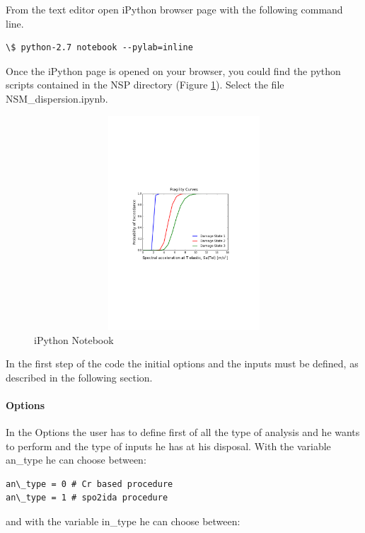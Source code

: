From the text editor open iPython browser page with the following command line. 

\begin{Verbatim}[frame=single, commandchars=\\\{\}, samepage=true]
\$ python-2.7 notebook --pylab=inline
\end{Verbatim}

Once the iPython page is opened on your browser, you could find the python scripts contained in the NSP directory (Figure \ref{fig:notebook}). Select the file NSM\_dispersion.ipynb.

\begin{figure}[H]
\centering
\includegraphics[width=12cm,height=8cm]{./figures/IdealisedCurve.pdf}
\caption{iPython Notebook}
\label{fig:notebook}
\end{figure}

In the first step of the code the initial options and the inputs must be defined, as described in the following section. 

\paragraph{Options}
\label{par:options}
In the Options the user has to define first of all the type of analysis and he wants to perform and the type of inputs he has at his disposal. With the variable an\_type he can choose between:

\begin{Verbatim}[frame=single, commandchars=\\\{\}, samepage=true]
an\_type = 0 # Cr based procedure
an\_type = 1 # spo2ida procedure
\end{Verbatim}

and with the variable in\_type he can choose between:

